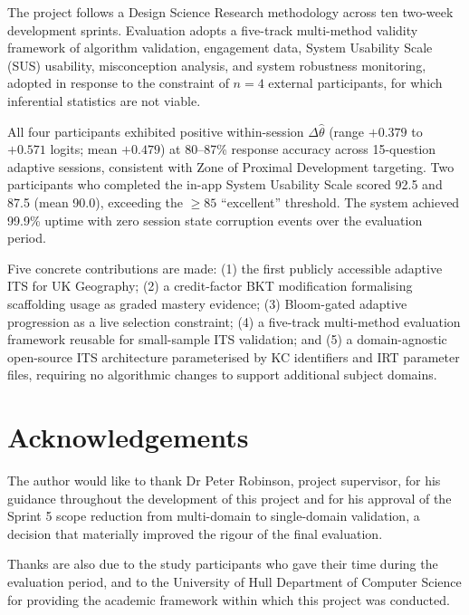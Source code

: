 \documentclass[12pt,a4paper]{report}
\begin{document}
The project follows a Design Science Research methodology across ten two-week
development sprints. Evaluation adopts a five-track multi-method validity
framework of algorithm validation, engagement data, System Usability Scale
(SUS) usability, misconception analysis, and system robustness monitoring,
adopted in response to the constraint of $n = 4$ external participants, for which
inferential statistics are not viable.

All four participants exhibited positive within-session $\Delta\hat{\theta}$
(range $+0.379$ to $+0.571$ logits; mean $+0.479$) at 80--87\% response
accuracy across 15-question adaptive sessions, consistent with Zone of Proximal
Development targeting. Two participants who completed the in-app System Usability
Scale scored 92.5 and 87.5 (mean 90.0), exceeding the $\geq 85$ ``excellent''
threshold. The system achieved 99.9\% uptime with zero session state corruption
events over the evaluation period.

Five concrete contributions are made: (1) the first publicly accessible adaptive
ITS for UK Geography; (2) a credit-factor BKT modification formalising
scaffolding usage as graded mastery evidence; (3) Bloom-gated adaptive
progression as a live selection constraint; (4) a five-track multi-method
evaluation framework reusable for small-sample ITS validation; and (5) a
domain-agnostic open-source ITS architecture parameterised by KC identifiers
and IRT parameter files, requiring no algorithmic changes to support additional
subject domains.

\chapter*{Acknowledgements}

The author would like to thank Dr Peter Robinson, project supervisor, for his
guidance throughout the development of this project and for his approval of
the Sprint 5 scope reduction from multi-domain to single-domain validation,
a decision that materially improved the rigour of the final evaluation.

Thanks are also due to the study participants who gave their time during the
evaluation period, and to the University of Hull Department of Computer
Science for providing the academic framework within which this project was
conducted.

\tableofcontents
\listoffigures
\listoftables

\clearpage
{}









\printbibliography[heading=bibintoc, title={References}]
\end{document}
